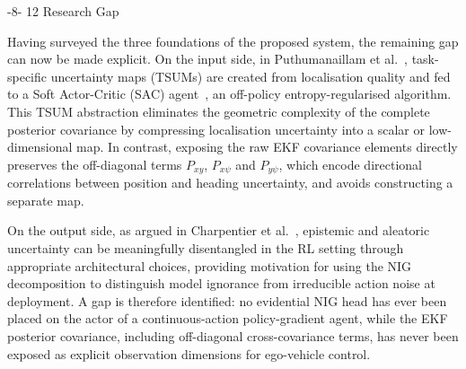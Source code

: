 \documentclass{sig-alternate}
\makeatletter
\renewcommand\subsection{\@startsection{subsection}{2}{\z@}%
    {-8\p@ \@plus -2\p@ \@minus -\p@}%
    {12\p@}%
    {\secfnt}}
\makeatother
\begin{document}
\subsection{Research Gap}

Having surveyed the three foundations of the proposed system, the remaining gap can now be made explicit. On the input side, in Puthumanaillam et al.~\cite{puthumanaillam2025guided}, task-specific uncertainty maps (TSUMs) are created from localisation quality and fed to a Soft Actor-Critic (SAC) agent~\cite{haarnoja2018sac}, an off-policy entropy-regularised algorithm. This TSUM abstraction eliminates the geometric complexity of the complete posterior covariance by compressing localisation uncertainty into a scalar or low-dimensional map. In contrast, exposing the raw EKF covariance elements directly preserves the off-diagonal terms $P_{xy}$, $P_{x\psi}$ and $P_{y\psi}$, which encode directional correlations between position and heading uncertainty, and avoids constructing a separate map.

On the output side, as argued in Charpentier et al.~\cite{charpentier2022disentangling}, epistemic and aleatoric uncertainty can be meaningfully disentangled in the RL setting through appropriate architectural choices, providing motivation for using the NIG decomposition to distinguish model ignorance from irreducible action noise at deployment. A gap is therefore identified: no evidential NIG head has ever been placed on the actor of a continuous-action policy-gradient agent, while the EKF posterior covariance, including off-diagonal cross-covariance terms, has never been exposed as explicit observation dimensions for ego-vehicle control.


\end{document}
